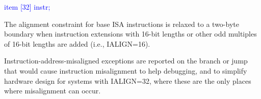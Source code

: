 \textcolor{blue}{
   item [32] instr; \\%
}



\begin{commentary}
The alignment constraint for base ISA instructions is relaxed to a
two-byte boundary when instruction extensions with 16-bit lengths or
other odd multiples of 16-bit lengths are added (i.e., IALIGN=16).

Instruction-address-misaligned exceptions are reported on the branch
or jump that would cause instruction misalignment to help debugging,
and to simplify hardware design for systems with IALIGN=32, where these
are the only places where misalignment can occur.
\end{commentary}

